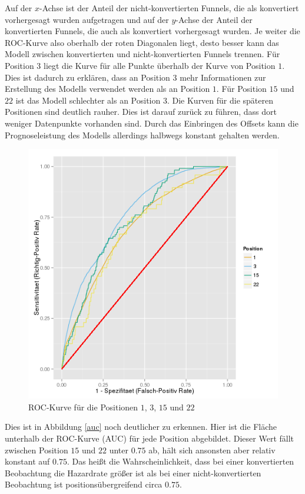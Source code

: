 Auf der $x$-Achse ist der Anteil der nicht-konvertierten Funnels, die als konvertiert vorhergesagt wurden aufgetragen und auf der $y$-Achse der Anteil der konvertierten Funnels, die auch als konvertiert vorhergesagt wurden. Je weiter die ROC-Kurve also oberhalb der roten Diagonalen liegt, desto besser kann das Modell zwischen konvertierten und nicht-konvertierten Funnels trennen. Für Position $3$ liegt die Kurve für alle Punkte überhalb der Kurve von Position $1$. Dies ist dadurch zu erklären, dass an Position $3$ mehr Informationen zur Erstellung des Modells verwendet werden als an Position $1$. Für Position $15$ und $22$ ist das Modell schlechter als an Position $3$. Die Kurven für die späteren Positionen sind deutlich rauher. Dies ist darauf zurück zu führen, dass dort weniger Datenpunkte vorhanden sind. Durch das Einbringen des Offsets kann die Prognoseleistung des Modells allerdings halbwegs konstant gehalten werden.\\
\begin{figure}[H]
	\centering\includegraphics[scale=0.75]{roc.png}\caption{ROC-Kurve für die Positionen $1$, $3$, $15$ und $22$}\label{roc}
\end{figure}
Dies ist in Abbildung \ref{auc} noch deutlicher zu erkennen. Hier ist die Fläche unterhalb der ROC-Kurve (AUC) für jede Position abgebildet. Dieser Wert fällt zwischen Position $15$ und $22$ unter $0.75$ ab, hält sich ansonsten aber relativ konstant auf $0.75$. Das heißt die Wahrscheinlichkeit, dass bei einer konvertierten Beobachtung die Hazardrate größer ist als bei einer nicht-konvertierten Beobachtung ist positionsübergreifend circa $0.75$.
